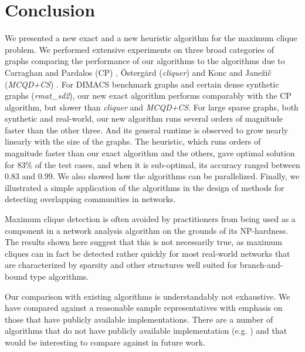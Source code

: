 \section{Conclusion}
\label{sec:conclusion}

We presented a new exact and a new heuristic algorithm for the maximum clique problem.
We performed extensive experiments on three broad categories of graphs comparing the 
performance of our algorithms to the algorithms due to
Carraghan and Pardalos (CP) \cite{pardalos},
\"{O}sterg\.{a}rd ({\it cliquer}) \cite{ostergard} and
Konc and Jane\v{z}i\v{c} ({\it MCQD+CS}) \cite{konc2007improved}.
For DIMACS benchmark graphs and certain dense synthetic graphs ({\it rmat\_sd2}), our new exact algorithm performs comparably with the CP algorithm, but slower than {\it cliquer}
and {\it MCQD+CS}. 
For large sparse graphs, both synthetic and real-world, our new algorithm runs
several orders of magnitude faster than the other three. 
And its general runtime is observed to grow nearly linearly with the size of the graphs. 
The heuristic, which runs orders of magnitude faster than our exact algorithm and the others, gave optimal solution for 83\% of the test cases, and when it is sub-optimal, its accuracy ranged between 0.83 and 0.99.
We also showed how the algorithms can be parallelized. Finally, we illustrated a simple application of the algorithms in the design of methods for detecting overlapping communities in networks. 

Maximum clique detection is often avoided by practitioners from being used as a component in 
a network analysis algorithm on the grounds of its NP-hardness. The results shown here suggest that this is not necessarily true, as maximum cliques can in fact be detected rather quickly for most real-world networks that are characterized by sparsity and other structures well suited for branch-and-bound type algorithms.

Our comparison with existing algorithms is understandably not exhaustive.
We have compared against a reasonable sample representatives with emphasis on those
that have publicly available implementations. There are a number of algorithms that do not have publicly available implementation (e.g. \cite{walcom,AAAI101611}) and that would be interesting to compare against in future work. 
